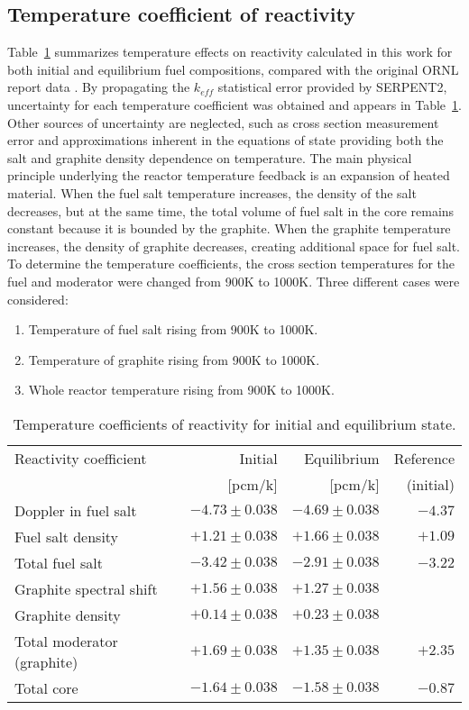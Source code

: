 \subsection{Temperature coefficient of reactivity}
Table~\ref{tab:tcoef} summarizes temperature effects on reactivity calculated 
in this work for both initial and equilibrium fuel compositions, compared 
with the original \gls{ORNL} report data \cite{robertson_conceptual_1971}. 
By propagating the $k_{eff}$  statistical error provided by SERPENT2, 
uncertainty for each temperature coefficient was obtained and appears in 
Table~\ref{tab:tcoef}. Other sources of uncertainty are neglected, such as 
cross section measurement error and approximations inherent in the equations of 
state providing both the salt and graphite density dependence on temperature.
The main physical principle underlying the reactor temperature feedback is an 
expansion of heated material. When the fuel salt temperature increases, the 
density of the salt decreases, but at the same time, the total volume of fuel 
salt in the core remains constant because it is bounded by the graphite. When 
the graphite temperature increases, the density of graphite decreases, creating 
additional space for fuel salt. To determine the temperature coefficients, the 
cross section temperatures for the fuel and moderator were changed from 900K to 
1000K. Three different cases were considered:
\begin{enumerate}
	\item Temperature of fuel salt rising from 900K to 1000K.
	\item Temperature of graphite rising from 900K to 1000K.
	\item Whole reactor temperature rising from 900K to 1000K.
\end{enumerate}
\begin{table}[ht!]
	\caption{Temperature coefficients of reactivity for initial and equilibrium 
		state.}
	\begin{tabularx}{\textwidth}{ X | r | r | r } \hline
		Reactivity coefficient               & Initial         & 
		Equilibrium     & Reference                                 \\ 
		& [pcm/k]         &  [pcm/k]        & 
		(initial)\cite{robertson_conceptual_1971} \tabularnewline  \hline
		Doppler in fuel salt                    & $-4.73\pm0.038$ & 
		$-4.69\pm0.038$ & $-4.37$  \tabularnewline
		Fuel salt density                       & $+1.21\pm0.038$ & 
		$+1.66\pm0.038$ & $+1.09$  \tabularnewline
		Total fuel salt                         & $-3.42\pm0.038$ & 
		$-2.91\pm0.038$ & $-3.22$  \tabularnewline \hline
		Graphite spectral shift                 & $+1.56\pm0.038$ & 
		$+1.27\pm0.038$ &          \tabularnewline
		Graphite density                        & $+0.14\pm0.038$ & 
		$+0.23\pm0.038$ &          \tabularnewline
		Total moderator (graphite)              & $+1.69\pm0.038$ & 
		$+1.35\pm0.038$ & $+2.35$  \tabularnewline \hline
		Total core                              & $-1.64\pm0.038$ & 
		$-1.58\pm0.038$ & $-0.87$  \tabularnewline \hline
	\end{tabularx}
	\label{tab:tcoef}
\end{table}
